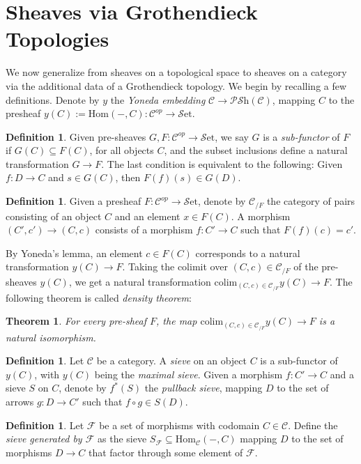\documentclass[10pt]{amsart}
\newcommand{\C}{\mathscr{C}}
\newcommand{\F}{\mathscr{F}}
\newcommand{\Hom}{\mathrm{Hom}}
\newcommand{\set}{\mathscr{S}\mathrm{et}}
\newcommand{\colim}{\mathrm{colim}}
\newcommand{\PSh}{\mathscr{P}\mathscr{S}\mathrm{h}}
\newtheorem{theorem}[equation]{Theorem}
\theoremstyle{definition}
\newtheorem{definition}[equation]{Definition}
\theoremstyle{remark}
\numberwithin{equation}{section}
\begin{document}
	\section{Sheaves via Grothendieck Topologies}
	
	We now generalize from sheaves on a topological space to sheaves on a category via the additional data of a Grothendieck topology. We begin by recalling a few definitions. Denote by $y$ the \textit{Yoneda embedding} $\C\to\PSh(\C)$, mapping $C$ to the presheaf $y(C):=\Hom(-,C)\colon\C^{op}\to\set$. 
	\begin{definition}
		Given pre-sheaves $G,F\colon\C^{op}\to\set$, we say $G$ is a \emph{sub-functor} of $F$ if $G(C)\subseteq F(C)$, for all objects $C$, and the subset inclusions define a natural transformation $G\to F$. The last condition is equivalent to the following: Given $f\colon D\to C$ and $s\in G(C)$, then $F(f)(s)\in G(D)$. 
	\end{definition}
	\begin{definition}
		Given a presheaf $F\colon\C^{op}\to\set$, denote by $\C_{/F}$ the category of pairs  consisting of an object $C$ and an element $x\in F(C)$. A morphism $(C',c')\to(C,c)$ consists of a morphism $f\colon C'\to C$ such that $F(f)(c)=c'$. 
	\end{definition}By Yoneda's lemma, an element $c\in F(C)$ corresponds to a natural transformation $y(C)\rightarrow F$. Taking the colimit over $(C,c)\in\C_{/F}$ of the pre-sheaves $y(C)$, we get a natural transformation $\colim_{(C,c)\in\C_{/F}}y(C)\rightarrow F$. The following theorem is called \textit{density theorem}:
	\begin{theorem}\label{density}
		For every pre-sheaf $F$, the map $\colim_{(C,c)\in\C_{/F}}y(C)\rightarrow F$ is a natural isomorphism.
	\end{theorem}
	\begin{definition}
		Let $\C$ be a category. A \emph{sieve} on an object $C$ is a sub-functor of $y(C)$, with $y(C)$ being the \textit{maximal sieve}. Given a morphism $f\colon C'\to C$ and a sieve $S$ on $C$, denote by $f^*(S)$ the \textit{pullback sieve}, mapping $D$ to the set of arrows $g\colon D\to C'$ such that $f\circ g\in S(D)$. 
	\end{definition}
	\begin{definition}\label{def:generatedsieve}
		Let ${\F}$ be a set of morphisms with codomain $C\in\C$. Define the \emph{sieve generated by $\F$} as the sieve $S_\F\subseteq\Hom_\C(-,C)$ mapping $D$ to the set of morphisms $D\to C$ that factor through some element of $\F$. 
	\end{definition}
\end{document}
